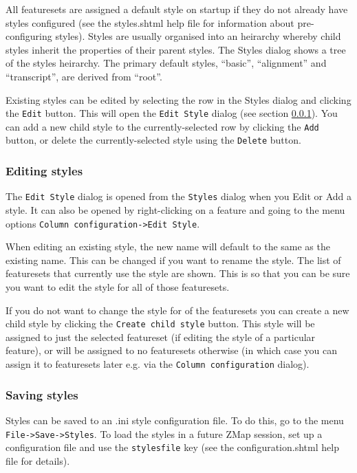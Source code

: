 \documentclass[letterpaper]{article}
\begin{document}
All featuresets are assigned a default style on startup if they do not already have styles configured (see the styles.shtml help file for information about pre-configuring styles). Styles are usually organised into an heirarchy whereby child styles inherit the properties of their parent styles. The Styles dialog shows a tree of the styles heirarchy. The primary default styles, ``basic'', ``alignment'' and ``transcript'', are derived from ``root''. 

Existing styles can be edited by selecting the row in the Styles dialog and clicking the \lstinline{Edit} button. This will open the \lstinline{Edit Style} dialog (see section \ref{sec_edit_style}). You can add a new child style to the currently-selected row by clicking the \lstinline{Add} button, or delete the currently-selected style using the \lstinline{Delete} button.

\subsubsection{Editing styles} \label{sec_edit_style}
The \lstinline{Edit Style} dialog is opened from the \lstinline{Styles} dialog when you Edit or Add a style. It can also be opened by right-clicking on a feature and going to the menu options \lstinline{Column configuration->Edit Style}.

When editing an existing style, the new name will default to the same as the existing name. This can be changed if you want to rename the style. The list of featuresets that currently use the style are shown. This is so that you can be sure you want to edit the style for all of those featuresets.

If you do not want to change the style for of the featuresets you can create a new child style by clicking the \lstinline{Create child style} button. This style will be assigned to just the selected featureset (if editing the style of a particular feature), or will be assigned to no featuresets otherwise (in which case you can assign it to featuresets later e.g. via the \lstinline{Column configuration} dialog).

\subsubsection{Saving styles}
Styles can be saved to an .ini style configuration file. To do this, go to the menu \lstinline{File->Save->Styles}. To load the styles in a future ZMap session, set up a configuration file and use the \lstinline{stylesfile} key (see the configuration.shtml help file for details).
\end{document}
